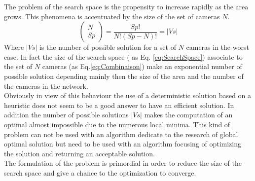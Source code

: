 The problem of the search space is the propensity to increase rapidly as the area grows. This phenomena is accentuated by the size of the set of cameras $N$.
 \begin{equation} \label{eq:Combinaison}
 \begin{pmatrix} N \\ Sp \end{pmatrix}  = \frac{Sp!}{N!(Sp-N)!} = |Vs|
 \end{equation} 
 Where $|Vs|$ is the number of possible solution for a set of $N$ cameras in the worst case. %
 In fact the size of the search space ( as Eq. \ref{eq:SearchSpace}) associate to the set of $N$ cameras (as Eq.\ref{eq:Combinaison}) make an exponential number of possible solution depending mainly then the size of the area and the number of the cameras in the network. \\
 Obviously in view of this behaviour the use of a deterministic solution based on a heuristic does not seem to be a good answer to have an efficient solution. In addition the number of possible solutions $|Vs|$ makes the computation of an optimal almost impossible due to the numerous local minima. This kind of problem can not be used with an algorithm dedicate to the research of global optimal solution but need to be used with an algorithm focusing of optimizing the solution and returning an acceptable solution.\\
 The formulation of the problem is primordial in order to reduce the size of the search space and give a chance to the optimization to converge.






 
